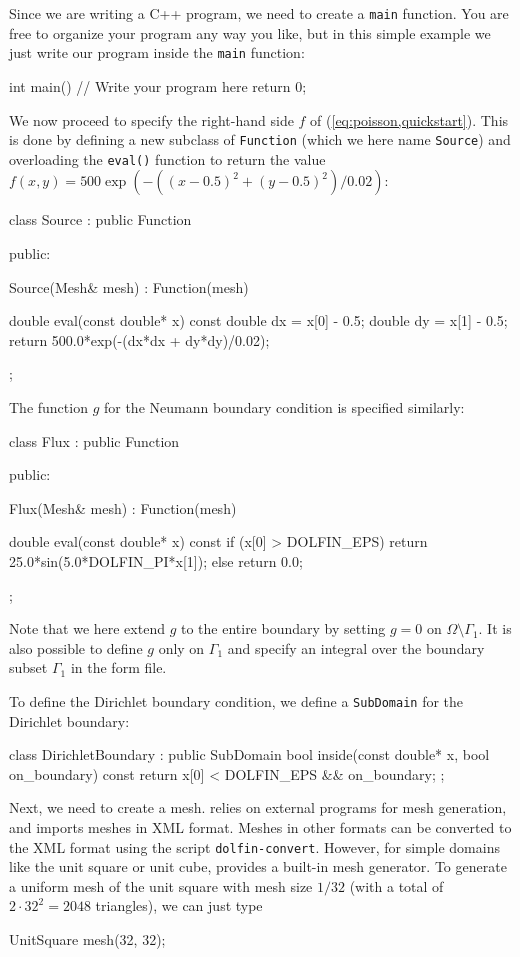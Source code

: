 Since we are writing a C++ program, we need to create a \texttt{main}
function.  You are free to organize your program any way you like, but
in this simple example we just write our program inside the
\texttt{main} function:

\begin{code}
int main()
{
  // Write your program here
  return 0;
}
\end{code}

We now proceed to specify the right-hand side $f$ of
(\ref{eq:poisson,quickstart}). This is done by defining a new subclass
of \texttt{Function} (which we here name \texttt{Source}) and
overloading the \texttt{eval()} function to return the value $f(x, y)
= 500 \exp(-((x-0.5)^2 + (y-0.5)^2)/0.02)$:
\begin{code}
class Source : public Function
{
public:
    
  Source(Mesh& mesh) : Function(mesh) {}

  double eval(const double* x) const
  {
    double dx = x[0] - 0.5;
    double dy = x[1] - 0.5;
    return 500.0*exp(-(dx*dx + dy*dy)/0.02);
  }

};
\end{code}

The function $g$ for the Neumann boundary condition is specified
similarly:
\begin{code}
class Flux : public Function
{
public:

  Flux(Mesh& mesh) : Function(mesh) {}

  double eval(const double* x) const
  {
    if (x[0] > DOLFIN_EPS)
      return 25.0*sin(5.0*DOLFIN_PI*x[1]);
    else
      return 0.0;
  }

};
\end{code}

Note that we here extend $g$ to the entire boundary by setting $g = 0$
on $\Omega \setminus \Gamma_1$. It is also possible to define $g$ only
on $\Gamma_1$ and specify an integral over the boundary subset
$\Gamma_1$ in the form file.

To define the Dirichlet boundary condition, we define a
\texttt{SubDomain} for the Dirichlet boundary:
\begin{code}
class DirichletBoundary : public SubDomain
{
  bool inside(const double* x, bool on_boundary) const
  {
    return x[0] < DOLFIN_EPS && on_boundary;
  }
};
\end{code}

Next, we need to create a mesh. \dolfin{} relies on external programs
for mesh generation, and imports meshes in \dolfin{} XML
format. Meshes in other formats can be converted to the \dolfin{} XML
format using the script \texttt{dolfin-convert}. However, for simple
domains like the unit square or unit cube, \dolfin{} provides a
built-in mesh generator. To generate a uniform mesh of the unit square
with mesh size $1/32$ (with a total of $2\cdot 32^2 = 2048$
triangles), we can just type
\begin{code}
UnitSquare mesh(32, 32);
\end{code}

